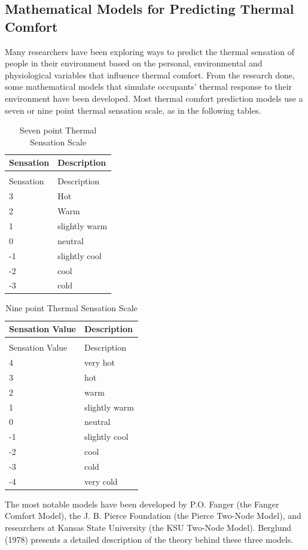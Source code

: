 \subsection{Mathematical Models for Predicting Thermal Comfort}\label{mathematical-models-for-predicting-thermal-comfort}

Many researchers have been exploring ways to predict the thermal sensation of people in their environment based on the personal, environmental and physiological variables that influence thermal comfort. From the research done, some mathematical models that simulate occupants' thermal response to their environment have been developed. Most thermal comfort prediction models use a seven or nine point thermal sensation scale, as in the following tables.

\begin{longtable}[c]{@{}ll@{}}
\caption{Seven point Thermal Sensation Scale \label{table:seven-point-thermal-sensation-scale}} \tabularnewline
\toprule
Sensation & Description \tabularnewline
\midrule
\endfirsthead

\caption[]{Seven point Thermal Sensation Scale} \tabularnewline
\toprule
Sensation & Description \tabularnewline
\midrule
\endhead

3 & Hot \tabularnewline
2 & Warm \tabularnewline
1 & slightly warm \tabularnewline
0 & neutral \tabularnewline
-1 & slightly cool \tabularnewline
-2 & cool \tabularnewline
-3 & cold \tabularnewline
\bottomrule
\end{longtable}

\begin{longtable}[c]{@{}ll@{}}
\caption{Nine point Thermal Sensation Scale \label{table:nine-point-thermal-sensation-scale}} \tabularnewline
\toprule
Sensation Value & Description \tabularnewline
\midrule
\endfirsthead

\caption[]{Nine point Thermal Sensation Scale} \tabularnewline
\toprule
Sensation Value & Description \tabularnewline
\midrule
\endhead

4 & very hot \tabularnewline
3 & hot \tabularnewline
2 & warm \tabularnewline
1 & slightly warm \tabularnewline
0 & neutral \tabularnewline
-1 & slightly cool \tabularnewline
-2 & cool \tabularnewline
-3 & cold \tabularnewline
-4 & very cold \tabularnewline
\bottomrule
\end{longtable}

The most notable models have been developed by P.O. Fanger (the Fanger Comfort Model), the J. B. Pierce Foundation (the Pierce Two-Node Model), and researchers at Kansas State University (the KSU Two-Node Model). Berglund (1978) presents a detailed description of the theory behind these three models.

